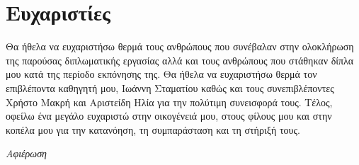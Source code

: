 \chapter*{Ευχαριστίες}

\pagestyle{plain}

Θα ήθελα να ευχαριστήσω θερμά τους ανθρώπους που συνέβαλαν στην ολοκλήρωση
της παρούσας διπλωματικής εργασίας αλλά και τους ανθρώπους που στάθηκαν δίπλα μου κατά της περίοδο εκπόνησης της. Θα ήθελα να ευχαριστήσω θερμά τον επιβλέποντα καθηγητή μου, Ιωάννη Σταματίου καθώς και τους συνεπιβλέποντες Χρήστο Μακρή και Αριστείδη Ηλία για την πολύτιμη συνεισφορά τους. Τέλος, οφείλω ένα μεγάλο ευχαριστώ στην οικογένειά μου, στους φίλους μου και στην κοπέλα μου για την κατανόηση, τη συμπαράσταση και τη στήριξή τους.


\null\vfill
\begin{flushright}
    \textit{Αφιέρωση}
\end{flushright}